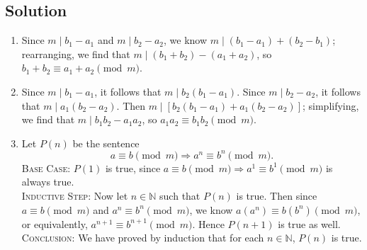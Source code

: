 \documentclass{article}
\begin{document}
\subsection*{Solution}
    \begin{enumerate}
        \item Since $m \mid b_1 - a_1$ and $m \mid b_2 - a_2$, we know $m \mid (b_1 - a_1) + (b_2 - b_1)$; rearranging, we find that $m \mid (b_1 + b_2) - (a_1 + a_2)$, so $b_1 + b_2 \equiv a_1 + a_2 \pmod m$.
        \item Since $m \mid b_1 - a_1$, it follows that $m \mid b_2(b_1 - a_1)$. Since $m \mid b_2 - a_2$, it follows that $m \mid a_1(b_2 - a_2)$. Then $m \mid [b_2(b_1 - a_1) + a_1(b_2 - a_2)]$; simplifying, we find that $m \mid b_1b_2 - a_1a_2$, so $a_1a_2 \equiv b_1b_2 \pmod{m}$.
        \item Let $P(n)$ be the sentence $$a \equiv b \pmod m \Rightarrow a^n \equiv b^n \pmod m.$$
        \textsc{Base Case}: $P(1)$ is true, since $a \equiv b \pmod m \Rightarrow a^1 \equiv b^1 \pmod m$ is always true. \\
        \textsc{Inductive Step}: Now let $n \in \mathbb{N}$ such that $P(n)$ is true. Then since $a \equiv b \pmod m$ and $a^n \equiv b^n \pmod m$, we know $a(a^n) \equiv b(b^n) \pmod m$, or equivalently, $a^{n + 1} \equiv b^{n + 1} \pmod m$. Hence $P(n + 1)$ is true as well. \\
        \textsc{Conclusion}: We have proved by induction that for each $n \in \mathbb{N}$, $P(n)$ is true.
    \end{enumerate}
    
\end{document}
